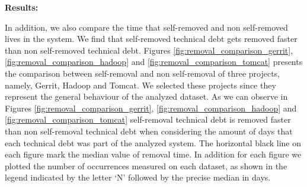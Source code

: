 \noindent \textbf{Results:} 

In addition, we also compare the time that self-removed and non self-removed \SATD lives in the system. We find that self-removed technical debt gets removed faster than non self-removed technical debt. Figures \ref{fig:removal_comparison_gerrit}, \ref{fig:removal_comparison_hadoop} and \ref{fig:removal_comparison_tomcat} presents the comparison between self-removal and non self-removal of three projects, namely, Gerrit, Hadoop and Tomcat. We selected these projects since they represent the general behaviour of the analyzed dataset. As we can observe in Figures \ref{fig:removal_comparison_gerrit}, \ref{fig:removal_comparison_hadoop} and \ref{fig:removal_comparison_tomcat} self-removal technical debt is removed faster than non self-removal technical debt when considering the amount of days that each technical debt was part of the analyzed system. The horizontal black line on each figure mark the median value of removal time. In addition for each figure we plotted the number of occurrences measured on each dataset, as shown in the legend indicated by the letter `N' followed by the precise median in days.






